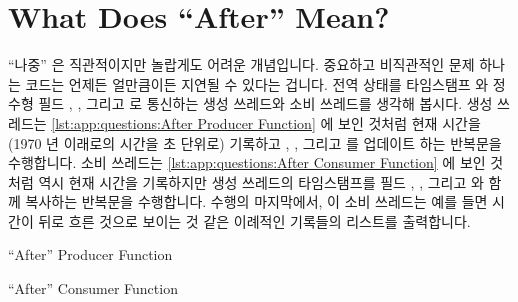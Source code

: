
\section{What Does ``After'' Mean?}
\label{sec:app:questions:What Does ``After'' Mean?}

``나중'' 은 직관적이지만 놀랍게도 어려운 개념입니다.
중요하고 비직관적인 문제 하나는 코드는 언제든 얼만큼이든 지연될 수 있다는
겁니다.
전역 상태를 타임스탬프  와 정수형 필드 , , 그리고 
로 통신하는 생성 쓰레드와 소비 쓰레드를 생각해 봅시다.
생성 쓰레드는
\cref{lst:app:questions:After Producer Function} 에 보인 것처럼
현재 시간을 (1970 년 이래로의 시간을 초 단위로) 기록하고 , ,
그리고  를 업데이트 하는 반복문을 수행합니다.
소비 쓰레드는
\cref{lst:app:questions:After Consumer Function} 에 보인 것처럼 역시 현재
시간을 기록하지만 생성 쓰레드의 타임스탬프를 필드 , , 그리고
 와 함께 복사하는 반복문을 수행합니다.
수행의 마지막에서, 이 소비 쓰레드는 예를 들면 시간이 뒤로 흐른 것으로 보이는 것
같은 이례적인 기록들의 리스트를 출력합니다.

\iffalse

``After'' is an intuitive, but surprisingly difficult concept.
An important non-intuitive issue is that code can be delayed at
any point for any amount of time.
Consider a producing and a consuming thread that communicate using
a global struct with a timestamp \qco{t} and integer fields \qco{a}, \qco{b},
and \qco{c}.
The producer loops recording the current time
(in seconds since 1970 in decimal),
then updating the values of \qco{a}, \qco{b}, and \qco{c},
as shown in \cref{lst:app:questions:After Producer Function}.
The consumer code loops, also recording the current time, but also
copying the producer's timestamp along with the fields \qco{a},
\qco{b}, and \qco{c}, as shown in
\cref{lst:app:questions:After Consumer Function}.
At the end of the run, the consumer outputs a list of anomalous recordings,
e.g., where time has appeared to go backwards.

\fi

\begin{listing}[htbp]

\caption{``After'' Producer Function}
\label{lst:app:questions:After Producer Function}
\end{listing}

\begin{listing}[htbp]

\caption{``After'' Consumer Function}
\label{lst:app:questions:After Consumer Function}
\end{listing}

